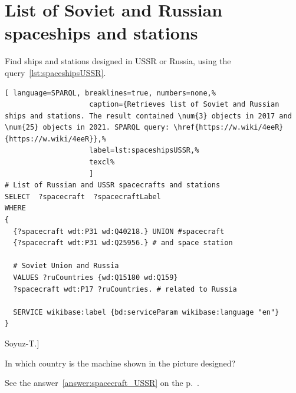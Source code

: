\section{List of Soviet and Russian spaceships and stations}

Find ships and stations designed in USSR or Russia, using the query~\ref{lst:spaceshipsUSSR}.

\begin{lstlisting}[ language=SPARQL, breaklines=true, numbers=none,%
                    caption={Retrieves list of Soviet and Russian ships and stations. The result contained \num{3} objects in 2017 and \num{25} objects in 2021. SPARQL query: \href{https://w.wiki/4eeR}{https://w.wiki/4eeR}},%
                    label=lst:spaceshipsUSSR,%
                    texcl%
                    ]
# List of Russian and USSR spacecrafts and stations
SELECT  ?spacecraft  ?spacecraftLabel 
WHERE
{
  {?spacecraft wdt:P31 wd:Q40218.} UNION #spacecraft
  {?spacecraft wdt:P31 wd:Q25956.} # and space station
  
  # Soviet Union and Russia
  VALUES ?ruCountries {wd:Q15180 wd:Q159}
  ?spacecraft wdt:P17 ?ruCountries. # related to Russia
  
  SERVICE wikibase:label {bd:serviceParam wikibase:language "en"}
}
\end{lstlisting}%

\begin{marginfigure}
{
	\setlength{\fboxsep}{0pt}%
	\setlength{\fboxrule}{1pt}%
}
\caption
[Soyuz-T.]{%
In which country is the machine shown in the picture designed?

See the answer~\ref{answer:spacecraft_USSR} on the p.~\pageref{answer:spacecraft_USSR}.
}
\label{question:spacecraft_soyuzT}
\end{marginfigure}

